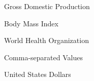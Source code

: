 \documentclass[oneside,12pt]{report}
\begin{document}
 Gross Domestic Production

\vspace{5pt}

 Body Mass Index

\vspace{5pt}

 World Health Organization

\vspace{5pt}

 Comma-separated Values

\vspace{5pt}

 United States Dollars




\renewcommand\bibname{Selected Bibliography Including Cited Works}
\nocite{*}  %

\end{document}
